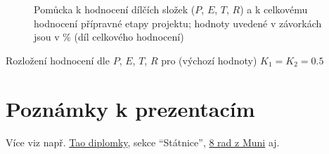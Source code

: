 \documentclass[a4paper,11pt, twoside]{report}
\begin{document}
\begin{figure}[h]
{

}

\vspace{-2mm}
\caption{Pomůcka k hodnocení dílčích složek ($P$, $E$, $T$, $R$) a k celkovému hodnocení přípravné etapy projektu;  
hodnoty uvedené v závorkách jsou v \% (díl celkového hodnocení)}
\label{fig:eval}
\end{figure}


\begin{table}
\caption{Rozložení hodnocení dle $P$, $E$, $T$, $R$ pro (výchozí hodnoty) $K_1=K_2=0.5$}
\label{tbl:eval}
\end{table}


\thispagestyle{fancy}


\chapter{Poznámky k prezentacím}

\label{chapt:prez}

\thispagestyle{fancy}

\vspace{-8mm}
Více viz např. \href{https://www.herout.net/tao-diplomky/}{Tao diplomky}, sekce ``Státnice'',
\href{https://www.em.muni.cz/student/5046-8-rad-jak-spravne-prezentovat}{8 rad z Muni}
aj.
\end{document}
